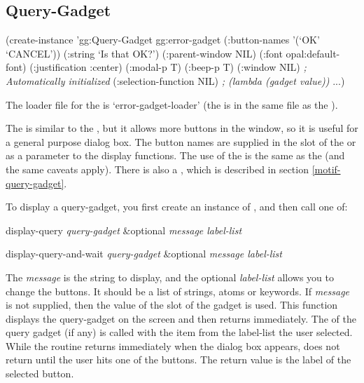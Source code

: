 \begin{group}
\section{Query-Gadget}
\label{query-gadget}
\begin{programexample}
(create-instance 'gg:Query-Gadget gg:error-gadget
   (:button-names '(`OK' `CANCEL'))
   (:string `Is that OK?')
   (:parent-window NIL)
   (:font opal:default-font)
   (:justification :center)
   (:modal-p T)
   (:beep-p T)
   (:window NIL)               {\it ; Automatically initialized}
   (:selection-function NIL)   {\it ; (lambda (gadget value))}
   ...)
\end{programexample}
\end{group}

The loader file for the  is `error-gadget-loader'
(the  is in the same file as the ).

The  is similar to the , but it allows
more buttons in the window, so it is useful for a general purpose dialog
box.  The button names are supplied in the  slot of the
 or as a parameter to the display functions.
The use of the  is the same as the 
(and the same caveats apply).  There is also a ,
which is described in section \ref{motif-query-gadget}.

To display a query-gadget, you first create an instance of
, and then call one of:
\begin{programexample}
display-query {\it query-gadget} \&optional {\it message label-list}

display-query-and-wait {\it query-gadget} \&optional {\it message label-list}
\end{programexample}
The {\it message} is the string to display, and the optional {\it label-list}
allows you to change the buttons.  It should be a list of strings, atoms or
keywords.  If {\it message} is not supplied, then the value of the 
slot of the gadget is used.  This function displays the query-gadget on the
screen and then returns immediately.  The  of the query
gadget (if any) is called with the item from the label-list the user
selected.  While the  routine returns immediately
when the dialog box appears,  does not
return until the user hits one of the buttons.  The return value
 is the label of the selected button.


